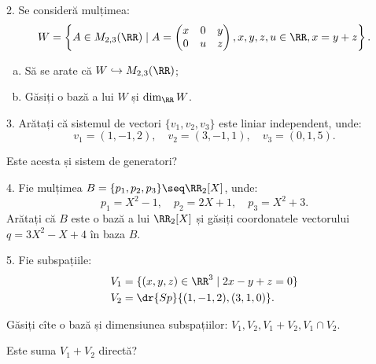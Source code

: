 \vspace{1cm}

2. Se consideră mulțimea:
\[
  W = \left\{ A \in M_{2, 3}(\RR) \mid A = \begin{pmatrix} x & 0 & y \\ 0 & u & z \end{pmatrix},
    x, y, z, u \in \RR, x = y + z \right\}.
\]
\begin{enumerate}[(a)]
\item Să se arate că $ W \hookrightarrow M_{2, 3}(\RR) $;
\item Găsiți o bază a lui $ W $ și $ \dim_\RR W $.
\end{enumerate}

\vspace{1cm}

3. Arătați că sistemul de vectori $ \{v_1, v_2, v_3 \} $ este liniar independent,
unde:
\[
  v_1 = (1, -1, 2), \quad v_2 = (3, -1, 1), \quad v_3 = (0, 1, 5).
\]

Este acesta și sistem de generatori?

\vspace{1cm}

4. Fie mulțimea $ B = \{ p_1, p_2, p_3 \} \seq \RR_2[X] $, unde:
\[
  p_1 = X^2 - 1, \quad p_2 = 2X + 1, \quad p_3 = X^2 + 3.
\]
Arătați că $ B $ este o bază a lui $ \RR_2[X] $ și găsiți coordonatele
vectorului $ q = 3X^2 - X + 4 $ în baza $ B $.

\vspace{1cm}

5. Fie subspațiile:
\begin{align*}
  V_1 &= \{ (x, y, z) \in \RR^3 \mid 2x - y + z = 0 \} \\
  V_2 &= \dr{Sp} \{ (1, -1, 2), (3, 1, 0) \}.
\end{align*}

Găsiți cîte o bază și dimensiunea subspațiilor: $ V_1, V_2, V_1 + V_2, V_1 \cap V_2 $.

Este suma $ V_1 + V_2 $ directă?

\vspace{1cm}

